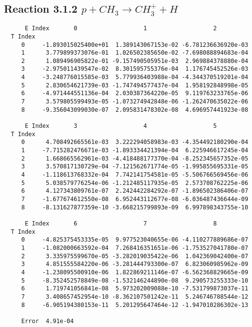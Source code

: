 \documentclass[12pt]{article}
\begin{document}
 
\subsection{ 
Reaction 3.1.2    $p + CH_3 \rightarrow CH_3^+ + H$
}
 

\begin{small}\begin{verbatim} 
      E Index       0                   1                   2
  T Index
     0     -1.893015025400e+01  1.389143067153e-02 -6.781236636920e-03
     1      3.779899373076e-01  1.026502385650e-02 -7.698088894683e-04
     2      1.089496905822e-01 -9.157490505951e-03  2.969884378880e-04
     3     -2.975011439547e-02  8.301595755376e-04  1.176745452526e-03
     4     -3.248776015585e-03  5.779936403988e-04 -4.344370519201e-04
     5      2.830654621739e-03 -1.747494577437e-04  1.958192848998e-05
     6     -4.971444551136e-04  2.030387364220e-05  9.119763233765e-06
     7      3.579805599493e-05 -1.073274942848e-06 -1.262470635022e-06
     8     -9.356043099030e-07  2.095831478302e-08  4.696957441923e-08
 
      E Index       3                   4                   5
  T Index
     0      4.708492665561e-03  3.222294058983e-03 -4.354492180290e-04
     1     -7.715282476671e-03 -1.893334421394e-04  6.225946617245e-04
     2      1.668665562961e-03 -4.418488177370e-04 -8.252345657352e-05
     3      3.570817130729e-04 -7.121562671774e-05 -1.995855695331e-05
     4     -1.118613768332e-04  7.742141754581e-05 -5.506766569456e-06
     5      5.038579776254e-06 -1.212485117935e-05  2.573708762225e-06
     6      4.127343809761e-07  2.242442284292e-07 -1.896502386406e-07
     7     -1.677674612550e-08  6.952443112677e-08 -6.036487436644e-09
     8     -8.131627877359e-10 -3.668215799893e-09  6.997898343755e-10
 
      E Index       6                   7                   8
  T Index
     0     -4.825375453335e-05  9.977523040655e-06 -4.110277889686e-07
     1     -1.082000663592e-04  7.268416351651e-06 -1.753527041780e-07
     2      3.335975599670e-05 -3.282019035422e-06  1.042369042400e-07
     3      4.851555584220e-06 -3.281444793300e-07  6.823060985962e-09
     4     -1.238095500910e-06  1.822869211146e-07 -6.562368829665e-09
     5     -8.352452578849e-08 -1.532146244890e-08  9.290573255333e-10
     6      1.719741056841e-08  5.973202009088e-10 -7.531799873037e-11
     7      3.408657452954e-10 -8.362107501242e-11  5.246746788544e-12
     8     -6.905194380153e-11  5.201295647464e-12 -1.947010286302e-13
 
     Error  4.91e-04
\end{verbatim}\end{small}
\end{document}
